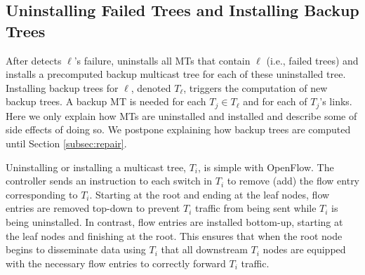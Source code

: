

















\subsection{Uninstalling Failed Trees and Installing Backup Trees}
\label{subsec:uninstall-install}

After \fl detects $\ell$'s failure, \mdr uninstalls all MTs that contain $\ell$ (i.e., failed trees) and installs a precomputed backup multicast tree for each of these uninstalled tree. Installing 
backup trees for $\ell$, denoted $T_{\ell}$, triggers the computation of new backup trees.  A backup MT is needed for each $T_j \in T_{\ell}$ and for each of $T_j$'s links.
Here we only explain how MTs are uninstalled and installed and describe some of side effects of doing so. We postpone explaining how backup trees are computed until Section \ref{subsec:repair}.

Uninstalling or installing a multicast tree, $T_i$, is simple with OpenFlow.  The controller sends an instruction to each switch in $T_i$ to remove (add) the flow entry corresponding to $T_i$.
Starting at the root and ending at the leaf nodes, flow entries are removed top-down to prevent $T_i$ traffic from being sent while $T_i$ is being uninstalled. 
In contrast, flow entries are installed bottom-up, starting at the leaf
nodes and finishing at the root.  This ensures that when the root node begins to disseminate data using $T_i$ that all downstream $T_i$ nodes are equipped with the necessary flow entries
to correctly forward $T_i$ traffic.

